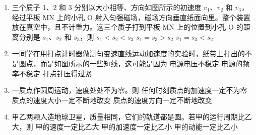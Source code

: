 \documentclass[\gkver]{gaokaozhenti}
\begin{document}
\begin{enumerate}
\item
三个质子 1、2 和 3 分别以大小相等、方向如图所示的初速度 $v_{1}$、$v_{2}$ 和 $v_{3}$，经过平板 MN 上的小孔 O 射入匀强磁场，磁场方向垂直纸面向里。整个装置放在真空中，且不计重力。这三个质子打到平板 MN 上的位置到小孔 O 的距离分别是 $s_{1}$、$s_{2}$ 和 $s_{3}$，则
{$s_{1} < s_{2} < s_{3}$}
{$s_{1} = s_{3} > s_{2}$}
{$s_{1} = s_{3} < s_{2}$}

\item
一同学在用打点计时器做测匀变速直线运动加速度的实验时，纸带上打出的不是圆点，而是如图所示的一些短线，这可能是因为
{电源电压不稳定}
{电源的频率不稳定}
{打点针压得过紧}

\item
一质点作圆周运动，速度处处不为零。则
{任何时刻质点的加速度一定不为零}
{质点的速度大小一定不断地改变}
{质点的速度方向一定不断地改变}

\item
甲乙两颗人造地球卫星，质量相同，它们的轨道都是圆。若甲的运行周期比乙大，则
{甲的速度一定比乙大}
{甲的加速度一定比乙小}
{甲的动能一定比乙小}


\end{enumerate}
\end{document}
